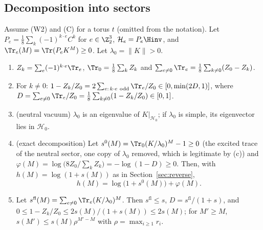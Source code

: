 \subsection{Decomposition into sectors}\label{subsec:T1}
\begin{proposition}\label{prop:sectors}
Assume (W2) and (C) for a torus $t$ (omitted from the notation). Let $P_e=\frac18\sum_k(-1)^{k\cdot e}C^k$ for $e\in\Z_2^3$, $\mathcal H_e=P_e\Hinv$, and $\Tr_e(M)=\Tr(P_eK^M)\ge0$. Let $\lambda_0=\|K\|>0$.
\begin{enumerate}
\item[(a)] $Z_k=\sum_e(-1)^{k\cdot e}\Tr_e$, $\Tr_0=\frac18\sum_kZ_k$ and $\sum_{e\ne0}\Tr_e=\frac18\sum_{k\ne0}(Z_0-Z_k)$.
\item[(b)] For $k\ne0$: $1-Z_k/Z_0=2\sum_{e:\,k\cdot e\ \mathrm{odd}}\Tr_e/Z_0\in[0,\min(2D,1)]$, where $D=\sum_{e\ne0}\Tr_e/Z_0=\frac18\sum_{k\ne0}(1-Z_k/Z_0)\in[0,1]$.
\item[(c)] (neutral vacuum) $\lambda_0$ is an eigenvalue of $K|_{\mathcal H_0}$; if $\lambda_0$ is simple, its eigenvector lies in $\mathcal H_0$.
\item[(d)] (exact decomposition) Let $s^0(M)=\Tr_0(K/\lambda_0)^M-1\ge0$ (the excited trace of the neutral sector, one copy of $\lambda_0$ removed, which is legitimate by (c)) and $\varphi(M)=\log\bigl(8Z_0/\sum_kZ_k\bigr)=-\log(1-D)\ge0$. Then, with $h(M)=\log(1+s(M))$ as in Section~\ref{sec:reverse},
\[
h(M)=\log\bigl(1+s^0(M)\bigr)+\varphi(M).
\]
\item[(e)] Let $s^{\mathrm{fl}}(M)=\sum_{e\ne0}\Tr_e(K/\lambda_0)^M$. Then $s^{\mathrm{fl}}\le s$, $D=s^{\mathrm{fl}}/(1+s)$, and $0\le1-Z_k/Z_0\le2s(M)/(1+s(M))\le2s(M)$; for $M'\ge M$, $s(M')\le s(M)\rho^{M'-M}$ with $\rho=\max_{i\ge1}r_i$.
\end{enumerate}
\end{proposition}
